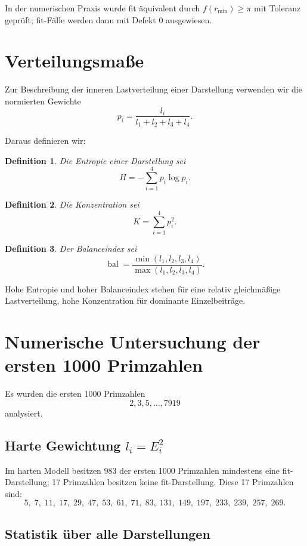 \documentclass[11pt,a4paper]{article}
\newtheorem{definition}{Definition}
\theoremstyle{remark}
\begin{document}
	In der numerischen Praxis wurde fit äquivalent durch \(f(r_{\min})\ge\pi\) mit Toleranz geprüft; fit-Fälle werden dann mit Defekt \(0\) ausgewiesen.
	
	\section{Verteilungsmaße}
	
	Zur Beschreibung der inneren Lastverteilung einer Darstellung verwenden wir die normierten Gewichte
	\[
	p_i=\frac{l_i}{l_1+l_2+l_3+l_4}.
	\]
	
	Daraus definieren wir:
	
	\begin{definition}
		Die \emph{Entropie} einer Darstellung sei
		\[
		H=-\sum_{i=1}^4 p_i\log p_i.
		\]
	\end{definition}
	
	\begin{definition}
		Die \emph{Konzentration} sei
		\[
		K=\sum_{i=1}^4 p_i^2.
		\]
	\end{definition}
	
	\begin{definition}
		Der \emph{Balanceindex} sei
		\[
		\operatorname{bal}
		=
		\frac{\min(l_1,l_2,l_3,l_4)}{\max(l_1,l_2,l_3,l_4)}.
		\]
	\end{definition}
	
	Hohe Entropie und hoher Balanceindex stehen für eine relativ gleichmäßige Lastverteilung, hohe Konzentration für dominante Einzelbeiträge.
	
	\section{Numerische Untersuchung der ersten 1000 Primzahlen}
	
	Es wurden die ersten 1000 Primzahlen
	\[
	2,3,5,\dots,7919
	\]
	analysiert.
	
	\subsection{Harte Gewichtung \(l_i=E_i^2\)}
	
	Im harten Modell besitzen 983 der ersten 1000 Primzahlen mindestens eine fit-Darstellung; 17 Primzahlen besitzen keine fit-Darstellung. 
	Diese 17 Primzahlen sind:
	\[
	5,\;7,\;11,\;17,\;29,\;47,\;53,\;61,\;71,\;83,\;131,\;149,\;197,\;233,\;239,\;257,\;269.
	\]
	
	\subsection{Statistik über alle Darstellungen}
	
\end{document}
